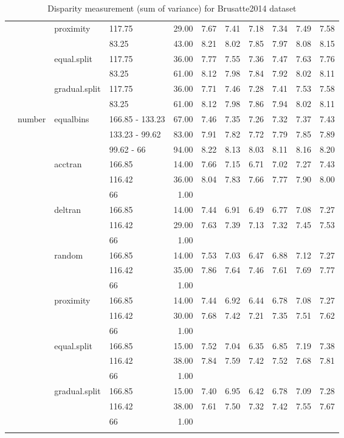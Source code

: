 \begin{longtable}{llllrrrrrrr}
   &  & proximity & 117.75 & 29.00 & 7.67 & 7.41 & 7.18 & 7.34 & 7.49 & 7.58 \\ 
   &  &  & 83.25 & 43.00 & 8.21 & 8.02 & 7.85 & 7.97 & 8.08 & 8.15 \\ 
   &  & equal.split & 117.75 & 36.00 & 7.77 & 7.55 & 7.36 & 7.47 & 7.63 & 7.76 \\ 
   &  &  & 83.25 & 61.00 & 8.12 & 7.98 & 7.84 & 7.92 & 8.02 & 8.11 \\ 
   &  & gradual.split & 117.75 & 36.00 & 7.71 & 7.46 & 7.28 & 7.41 & 7.53 & 7.58 \\ 
   &  &  & 83.25 & 61.00 & 8.12 & 7.98 & 7.86 & 7.94 & 8.02 & 8.11 \\ 
   & number & equalbins & 166.85 - 133.23 & 67.00 & 7.46 & 7.35 & 7.26 & 7.32 & 7.37 & 7.43 \\ 
   &  &  & 133.23 - 99.62 & 83.00 & 7.91 & 7.82 & 7.72 & 7.79 & 7.85 & 7.89 \\ 
   &  &  & 99.62 - 66 & 94.00 & 8.22 & 8.13 & 8.03 & 8.11 & 8.16 & 8.20 \\ 
   &  & acctran & 166.85 & 14.00 & 7.66 & 7.15 & 6.71 & 7.02 & 7.27 & 7.43 \\ 
   &  &  & 116.42 & 36.00 & 8.04 & 7.83 & 7.66 & 7.77 & 7.90 & 8.00 \\ 
   &  &  & 66 & 1.00 &  &  &  &  &  &  \\ 
   &  & deltran & 166.85 & 14.00 & 7.44 & 6.91 & 6.49 & 6.77 & 7.08 & 7.27 \\ 
   &  &  & 116.42 & 29.00 & 7.63 & 7.39 & 7.13 & 7.32 & 7.45 & 7.53 \\ 
   &  &  & 66 & 1.00 &  &  &  &  &  &  \\ 
   &  & random & 166.85 & 14.00 & 7.53 & 7.03 & 6.47 & 6.88 & 7.12 & 7.27 \\ 
   &  &  & 116.42 & 35.00 & 7.86 & 7.64 & 7.46 & 7.61 & 7.69 & 7.77 \\ 
   &  &  & 66 & 1.00 &  &  &  &  &  &  \\ 
   &  & proximity & 166.85 & 14.00 & 7.44 & 6.92 & 6.44 & 6.78 & 7.08 & 7.27 \\ 
   &  &  & 116.42 & 30.00 & 7.68 & 7.42 & 7.21 & 7.35 & 7.51 & 7.62 \\ 
   &  &  & 66 & 1.00 &  &  &  &  &  &  \\ 
   &  & equal.split & 166.85 & 15.00 & 7.52 & 7.04 & 6.35 & 6.85 & 7.19 & 7.38 \\ 
   &  &  & 116.42 & 38.00 & 7.84 & 7.59 & 7.42 & 7.52 & 7.68 & 7.81 \\ 
   &  &  & 66 & 1.00 &  &  &  &  &  &  \\ 
   &  & gradual.split & 166.85 & 15.00 & 7.40 & 6.95 & 6.42 & 6.78 & 7.09 & 7.28 \\ 
   &  &  & 116.42 & 38.00 & 7.61 & 7.50 & 7.32 & 7.42 & 7.55 & 7.67 \\ 
   &  &  & 66 & 1.00 &  &  &  &  &  &  \\ 
   \hline
\hline
\caption{Disparity measurement (sum of variance) for Brusatte2014 dataset} 
\end{longtable}

